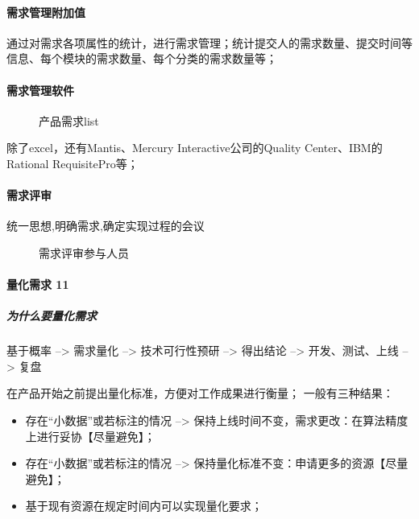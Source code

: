 \documentclass[letterpaper,10pt,english]{sphinxmanual}
\begin{document}
\paragraph{需求管理附加值}
\label{\detokenize{chapter_introduction/need:id15}}
通过对需求各项属性的统计，进行需求管理；统计提交人的需求数量、提交时间等信息、每个模块的需求数量、每个分类的需求数量等；


\paragraph{需求管理软件}
\label{\detokenize{chapter_introduction/need:id16}}
\begin{figure}[H]
\centering
\capstart

\noindent{}
\caption{产品需求list}\label{\detokenize{chapter_introduction/need:id23}}\end{figure}

除了excel，还有Mantis、Mercury Interactive公司的Quality
Center、IBM的Rational RequisitePro等；


\paragraph{需求评审}
\label{\detokenize{chapter_introduction/need:id17}}
统一思想,明确需求,确定实现过程的会议

\begin{figure}[H]
\centering
\capstart

\noindent{}
\caption{需求评审参与人员}\label{\detokenize{chapter_introduction/need:id24}}\end{figure}


\paragraph{量化需求 11\sphinxfootnotemark[36]}
\label{\detokenize{chapter_introduction/need:id18}}%
\begin{footnotetext}[36]\sphinxAtStartFootnote
{}
%
\end{footnotetext}\ignorespaces 

\subparagraph{为什么要量化需求}
\label{\detokenize{chapter_introduction/need:id19}}
基于概率 –> 需求量化 –> 技术可行性预研 –> 得出结论 –> 开发、测试、上线
–> 复盘

在产品开始之前提出量化标准，方便对工作成果进行衡量； 一般有三种结果：
\begin{itemize}
\item {} 
存在“小数据”或若标注的情况 –>
保持上线时间不变，需求更改：在算法精度上进行妥协【尽量避免】；

\item {} 
存在“小数据”或若标注的情况 –>
保持量化标准不变：申请更多的资源【尽量避免】；

\item {} 
基于现有资源在规定时间内可以实现量化要求；

\end{itemize}
\end{document}
